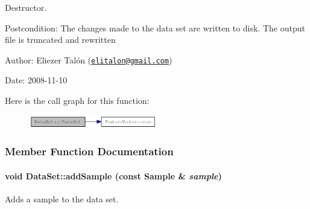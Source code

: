 Destructor. 

\begin{Desc}
\item[Postcondition:]The changes made to the data set are written to disk. The output file is truncated and rewritten\end{Desc}
\begin{Desc}
\item[Author:]Eliezer Talón (\href{mailto:elitalon@gmail.com}{\tt elitalon@gmail.com}) \end{Desc}
\begin{Desc}
\item[Date:]2008-11-10 \end{Desc}


Here is the call graph for this function:\nopagebreak
\begin{figure}[H]
\begin{center}
\leavevmode
\includegraphics[width=159pt]{class_data_set_2cdb84d32331956b413ca36933e516bd_cgraph}
\end{center}
\end{figure}


\subsubsection{Member Function Documentation}
\hypertarget{class_data_set_73b646f0b40545eaf7bbe72418a0ed51}{
\paragraph[{addSample}]{\setlength{\rightskip}{0pt plus 5cm}void DataSet::addSample (const {\bf Sample} \& {\em sample})}\hfill}
\label{class_data_set_73b646f0b40545eaf7bbe72418a0ed51}


Adds a sample to the data set. 

